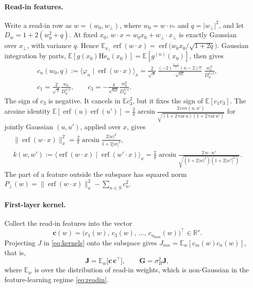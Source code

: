 \documentclass[11pt,a4paper]{article}
\newcommand{\E}{\mathbb{E}}
\newcommand{\erf}{\operatorname{erf}}
\newcommand{\He}{\mathrm{He}}
\begin{document}
\paragraph{Read-in features.}
Write a read-in row as $w=(w_0,w_\perp)$, where $w_0=w\cdot v_*$ and $q=|w_\perp|^2$, and let $D_w=1+2(w_0^2+q)$.
At fixed $x_0$, $w\cdot x=w_0x_0+w_\perp\cdot x_\perp$ is exactly Gaussian over $x_\perp$, with variance $q$.
Hence $\E_{x_\perp}\erf(w\cdot x)=\erf\big(w_0x_0/\sqrt{1+2q}\big)$.
Gaussian integration by parts, $\E[g(x_0)\He_n(x_0)]=\E[g^{(n)}(x_0)]$, then gives
\begin{gather}
  c_n(w_0,q):=\langle\varphi_n\mid\erf(w\cdot x)\rangle_x
  =\frac{2}{\sqrt\pi}\,\frac{(-2)^{\frac{n-1}{2}}(n-2)!!}{\sqrt{n!}}\;\frac{w_0^{\,n}}{D_w^{n/2}},
  \label{eq:cn}\\
  c_1=\frac{2}{\sqrt\pi}\frac{w_0}{D_w^{1/2}},\qquad
  c_3=-\frac{4}{\sqrt{6\pi}}\frac{w_0^3}{D_w^{3/2}} . \nonumber
\end{gather}
The sign of $c_3$ is negative.
It cancels in $\E c_3^2$, but it fixes the sign of $\E[c_1c_3]$.
The arcsine identity $\E[\erf(u)\erf(u')]=\frac2\pi\arcsin\frac{2\,\mathrm{cov}(u,u')}{\sqrt{(1+2\,\mathrm{var}\,u)(1+2\,\mathrm{var}\,u')}}$ for jointly
Gaussian $(u,u')$, applied over $x$, gives
\begin{gather}
  \|\erf(w\cdot x)\|_x^2=\frac2\pi\arcsin\frac{2|w|^2}{1+2|w|^2}, \nonumber\\
  k(w,w'):=\langle\erf(w\cdot x)\mid\erf(w'\cdot x)\rangle_x
  =\frac2\pi\arcsin\frac{2\,w\cdot w'}{\sqrt{(1+2|w|^2)(1+2|w'|^2)}} .
  \label{eq:kww}
\end{gather}
The part of a feature outside the subspace has squared norm $P_\perp(w)=\|\erf(w\cdot x)\|_x^2-\sum_{n\in S}c_n^2$.

\paragraph{First-layer kernel.}
Collect the read-in features into the vector
\begin{equation*}
  \mathbf c(w)=\big(c_1(w),\,c_3(w),\,\dots,\,c_{n_{\max}}(w)\big)^\top\in\mathbb R^{s}.
\end{equation*}
Projecting $J$ in \eqref{eq:kernels} onto the subspace gives $J_{mn}=\E_w[c_m(w)c_n(w)]$, that is,
\begin{equation}
  \mathbf J=\E_w\big[\mathbf c\,\mathbf c^\top\big],\qquad \mathbf G=\sigma_B^2\mathbf J ,
  \label{eq:JS}
\end{equation}
where $\E_w$ is over the distribution of read-in weights, which is non-Gaussian in the feature-learning regime \eqref{eq:readin}.
\end{document}

